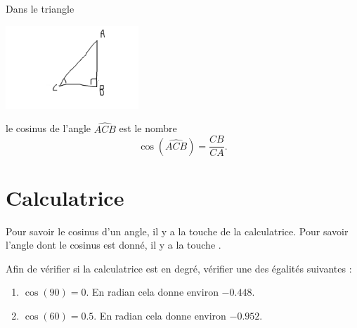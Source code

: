 \begin{example}
    Dans le triangle
    \begin{center}
        \includegraphics[width=5cm]{faux_ex_adj.pdf}
    \end{center}
    le cosinus de l'angle \( \widehat{ACB}\) est le nombre
    \begin{equation}
        \cos(\widehat{ACB})=\frac{ CB }{ CA }.
    \end{equation}
\end{example}





\section{Calculatrice}

\begin{Aretenir}
    Pour savoir le cosinus d'un angle, il y a la touche  de la calculatrice. Pour savoir l'angle dont le cosinus est donné, il y a la touche .
\end{Aretenir}

Afin de vérifier si la calculatrice est en degré, vérifier une des égalités suivantes :
\begin{enumerate}
    \item
        \( \cos(90)=0\). En radian cela donne environ \( -0.448\).
    \item
        \( \cos(60)=0.5\). En radian cela donne environ \( -0.952\).
\end{enumerate}
